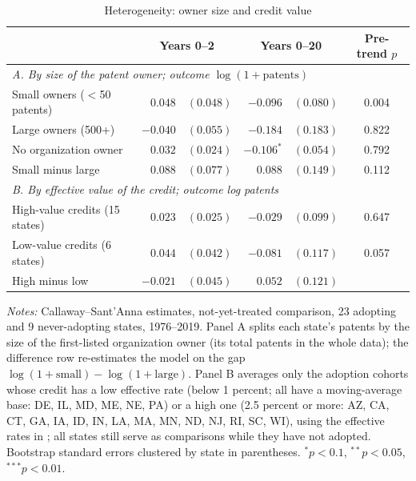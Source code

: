 \begin{table}[t]
\centering
\caption{Heterogeneity: owner size and credit value}
\label{tab:heterogeneity}
\begin{threeparttable}
\begin{tabular}{lr@{\,}lr@{\,}lc}
\toprule
 & \multicolumn{2}{c}{Years 0--2} & \multicolumn{2}{c}{Years 0--20} & Pre-trend $p$ \\
\midrule
\multicolumn{6}{l}{\textit{A. By size of the patent owner; outcome $\log(1+\text{patents})$}} \\
\quad Small owners ($<$50 patents) & $0.048$ & $(0.048)$ & $-0.096$ & $(0.080)$ & 0.004 \\
\quad Large owners (500+) & $-0.040$ & $(0.055)$ & $-0.184$ & $(0.183)$ & 0.822 \\
\quad No organization owner & $0.032$ & $(0.024)$ & $-0.106^{*}$ & $(0.054)$ & 0.792 \\
\quad Small minus large & $0.088$ & $(0.077)$ & $0.088$ & $(0.149)$ & 0.112 \\
\midrule
\multicolumn{6}{l}{\textit{B. By effective value of the credit; outcome log patents}} \\
\quad High-value credits (15 states) & $0.023$ & $(0.025)$ & $-0.029$ & $(0.099)$ & 0.647 \\
\quad Low-value credits (6 states) & $0.044$ & $(0.042)$ & $-0.081$ & $(0.117)$ & 0.057 \\
\quad High minus low & $-0.021$ & $(0.045)$ & $0.052$ & $(0.121)$ & \\
\bottomrule
\end{tabular}
\begin{tablenotes}[flushleft]\footnotesize
\item \textit{Notes:} Callaway--Sant'Anna estimates, not-yet-treated comparison, 23 adopting and 9
never-adopting states, 1976--2019. Panel A splits each state's patents by the size of the first-listed
organization owner (its total patents in the whole data); the difference row re-estimates the model on
the gap $\log(1+\text{small})-\log(1+\text{large})$. Panel B averages only the adoption cohorts whose
credit has a low effective rate (below 1 percent; all have a moving-average base: DE, IL, MD, ME, NE, PA)
or a high one (2.5 percent or more: AZ, CA, CT, GA, IA, ID, IN, LA, MA, MN, ND, NJ, RI, SC, WI), using the effective rates in
\citet{wilson2009beggar}; all states still serve as comparisons while they have not adopted.
Bootstrap standard errors clustered by state in parentheses. $^{*}p<0.1$, $^{**}p<0.05$, $^{***}p<0.01$.
\end{tablenotes}
\end{threeparttable}
\end{table}
